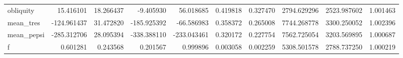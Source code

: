 \begin{tabular}{lrrrrrrrrr}
obliquity     &   15.416101 &  18.266437 &   -9.405930 &   56.018685 &   0.419818 &  0.327470 &  2794.629296 &  2523.987602 &  1.001463 \\
mean\_tres     & -124.961437 &  31.472820 & -185.925392 &  -66.586983 &   0.358372 &  0.265008 &  7744.268778 &  3300.250052 &  1.002396 \\
mean\_pepsi    & -285.312706 &  28.095394 & -338.388110 & -233.043461 &   0.320172 &  0.227754 &  7562.725054 &  3203.569895 &  1.000687 \\
f             &    0.601281 &   0.243568 &    0.201567 &    0.999896 &   0.003058 &  0.002259 &  5308.501578 &  2788.737250 &  1.000219 \\
\bottomrule
\end{tabular}
